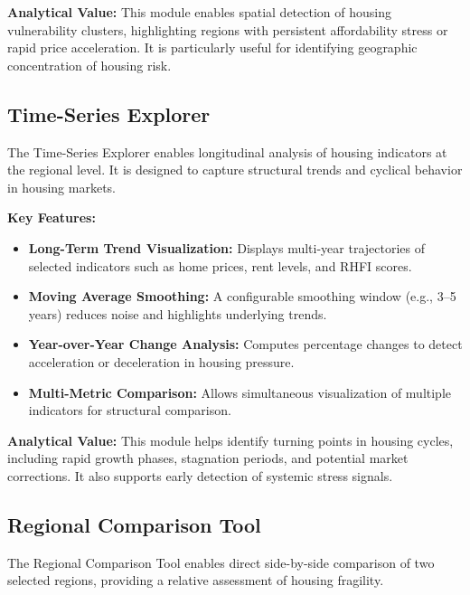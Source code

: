 \documentclass[11pt,twocolumn]{article}
\begin{document}
    \textbf{Analytical Value:}
    This module enables spatial detection of housing vulnerability clusters, highlighting regions with persistent affordability stress or rapid price acceleration. It is particularly useful for identifying geographic concentration of housing risk.

    \subsection{Time-Series Explorer}

    The Time-Series Explorer enables longitudinal analysis of housing indicators at the regional level. It is designed to capture structural trends and cyclical behavior in housing markets.

    \textbf{Key Features:}
    \begin{itemize}[leftmargin=1.2em]
        \item \textbf{Long-Term Trend Visualization:} Displays multi-year trajectories of selected indicators such as home prices, rent levels, and RHFI scores.

        \item \textbf{Moving Average Smoothing:} A configurable smoothing window (e.g., 3–5 years) reduces noise and highlights underlying trends.

        \item \textbf{Year-over-Year Change Analysis:} Computes percentage changes to detect acceleration or deceleration in housing pressure.

        \item \textbf{Multi-Metric Comparison:} Allows simultaneous visualization of multiple indicators for structural comparison.
    \end{itemize}

    \textbf{Analytical Value:}
    This module helps identify turning points in housing cycles, including rapid growth phases, stagnation periods, and potential market corrections. It also supports early detection of systemic stress signals.

    \subsection{Regional Comparison Tool}

    The Regional Comparison Tool enables direct side-by-side comparison of two selected regions, providing a relative assessment of housing fragility.
\end{document}
